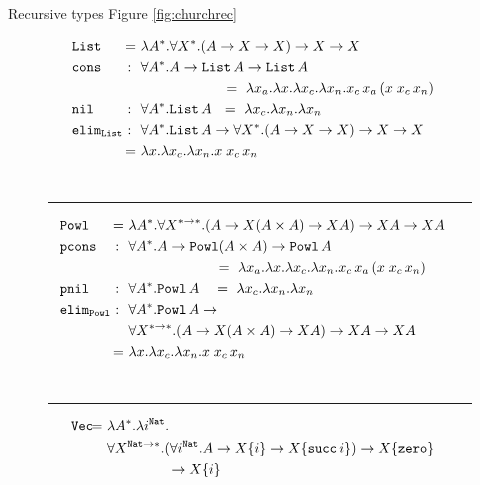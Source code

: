 Recursive types
Figure \ref{fig:churchrec}
\begin{figure}
\begin{align*}
&\!\!\!\!\!\!\mathtt{List} &\!\!\!\!\!=~& \l A^{*}.\forall X^{*}.(A-> X-> X)-> X-> X
	\\
&\!\!\!\!\!\!\texttt{cons} &\!\!\!\!\!:~~& \forall A^{*}.A-> \mathtt{List}\,A-> \mathtt{List}\,A \\
& & & \qquad~\qquad~\quad\, =~\l x_a.\l x.\l x_c.\l x_n. x_c\,x_a\,(x\;x_c\,x_n) \\
&\!\!\!\!\!\!\mathtt{nil} &\!\!\!\!\!:~~& \forall A^{*}.\texttt{List}\,A
~~=~ \l x_c.\l x_n.\l x_n \\
&\!\!\!\!\!\!\mathtt{elim_{List}} &\!\!\!\!:~~& \forall A^{*}.\texttt{List}\,A ->
	\forall X^{*}.(A -> X -> X) -> X -> X \\
& &\!\!\!\!\!=~& \l x.\l x_c. \l x_n.x\;x_c\,x_n
\end{align*}\vspace*{-19pt} \\ \vspace*{-4pt}
\rule{\linewidth}{.5pt}
\begin{align*}
&\!\!\!\!\!\!\mathtt{Powl} &\!\!\!\!\!=~& \l A^{*}.\forall X^{*-> *}.(A-> X(A\times A)-> XA)-> XA -> XA \\
&\!\!\!\!\!\!\texttt{pcons} &\!\!\!\!\!:~~& \forall A^{*}.A-> \mathtt{Powl}(A\times A)-> \mathtt{Powl}\,A \\
&&& \qquad~\qquad~\quad\, ~=~ \l x_a.\l x.\l x_c.\l x_n. x_c\,x_a\,(x\;x_c\,x_n) \\
&\!\!\!\!\!\!\mathtt{pnil} &\!\!\!\!\!:~~& \forall A^{*}.\texttt{Powl}\,A
~~~=~ \l x_c.\l x_n.\l x_n \\
&\!\!\!\!\!\!\mathtt{elim_{Powl}} &\!\!\!\!:~~& \forall A^{*}.\texttt{Powl}\,A -> \\
&&& \forall X^{*-> *}.(A -> X(A\times A) -> XA) -> XA -> XA \\
& &\!\!\!\!\!=~& \l x.\l x_c. \l x_n.x\;x_c\,x_n
\end{align*}\vspace*{-19pt} \\ \vspace*{-4pt}
\rule{\linewidth}{.5pt}
\begin{align*}
&\!\!\!\!\!\!\mathtt{Vec} &\!\!\!\!\!\!\!\!=~& \l A^{*}.\l i^{\mathtt{Nat}}.\\
&&&	\forall X^{\mathtt{Nat}-> *}.
	(\forall i^\mathtt{Nat}.A-> X\{i\}-> X\{\mathtt{succ}\,i\}) ->
	X\{\texttt{zero}\} \\
&&& \qquad~\qquad -> X\{i\} \\

\end{align*}
\end{figure}

